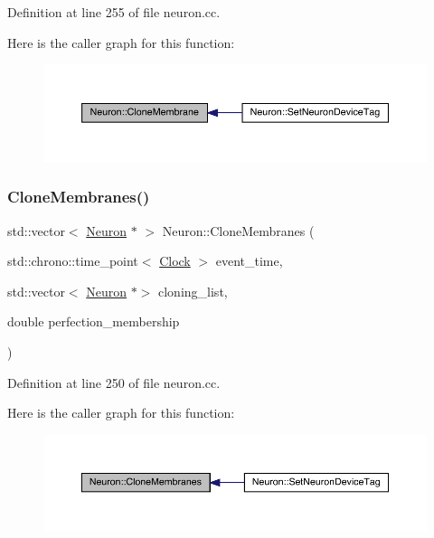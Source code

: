 Definition at line 255 of file neuron.\+cc.

Here is the caller graph for this function\+:
\nopagebreak
\begin{figure}[H]
\begin{center}
\leavevmode
\includegraphics[width=350pt]{class_neuron_ab85f7c42466657095efb3aca5a9ee71d_icgraph}
\end{center}
\end{figure}
\mbox{\label{class_neuron_ae119d77522a4f11f5d9b1e935a9c80ba}} 
\subsubsection{\texorpdfstring{Clone\+Membranes()}{CloneMembranes()}}
{\footnotesize\ttfamily std\+::vector$<$ \hyperlink{class_neuron}{Neuron} $\ast$ $>$ Neuron\+::\+Clone\+Membranes (\begin{DoxyParamCaption}\item[{std\+::chrono\+::time\+\_\+point$<$ \hyperlink{universe_8h_a0ef8d951d1ca5ab3cfaf7ab4c7a6fd80}{Clock} $>$}]{event\+\_\+time,  }\item[{std\+::vector$<$ \hyperlink{class_neuron}{Neuron} $\ast$$>$}]{cloning\+\_\+list,  }\item[{double}]{perfection\+\_\+membership }\end{DoxyParamCaption})}



Definition at line 250 of file neuron.\+cc.

Here is the caller graph for this function\+:
\nopagebreak
\begin{figure}[H]
\begin{center}
\leavevmode
\includegraphics[width=350pt]{class_neuron_ae119d77522a4f11f5d9b1e935a9c80ba_icgraph}
\end{center}
\end{figure}
\mbox{\label{class_neuron_a7706e0f722c70138458423c07b6b153b}} 
